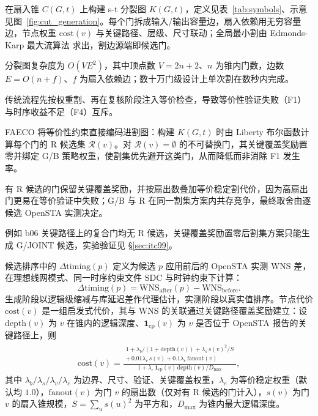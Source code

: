 \documentclass[twocolumn,10pt]{ctexart}
\begin{document}
在扇入锥 $C(G, t)$ 上构建 s-t 分裂图 $K(G, t)$，定义见表~\ref{tab:symbols}、示意见图~\ref{fig:cut_generation}。每个门拆成输入/输出容量边，扇入依赖用无穷容量边，节点权重 $\mathrm{cost}(v)$ 与关键路径、层级、尺寸联动；全局最小割由 Edmonds-Karp 最大流算法\cite{edmondskarp} 求出，割边源端即候选门。

分裂图复杂度为 $O(VE^2)$，其中顶点数 $V=2n+2$、$n$ 为锥内门数，边数 $E=O(n+f)$、$f$ 为扇入依赖边；数十万门级设计上单次割在数秒内完成。

传统流程先按权重割、再在复核阶段注入等价检查，导致等价性验证失败（F1）与时序收益不足（F4）互斥。

FAECO 将等价性约束直接编码进割图：构建 $K(G, t)$ 时由 Liberty 布尔函数计算每个门的 R 候选集 $\mathcal{R}(v)$。对 $\mathcal{R}(v)=\emptyset$ 的不可替换门，其关键覆盖奖励置零并绑定 G/B 策略权重，使割集优先避开这类门，从而降低而非消除 F1 发生率。

有 R 候选的门保留关键覆盖奖励，并按扇出数叠加等价稳定割代价，因为高扇出门更易在等价验证中失败；G/B 与 R 在同一割集方案内共存竞争，最终取舍由逐候选 OpenSTA 实测决定。

例如 b06 关键路径上的复合门均无 R 候选，关键覆盖奖励置零后割集方案只能生成 G/JOINT 候选，实验验证见 \S\ref{sec:itc99}。

候选排序中的 $\Delta\mathrm{timing}(p)$ 定义为候选 $p$ 应用前后的 OpenSTA 实测 WNS 差，在理想线网模式、同一时序约束文件 SDC 与时钟约束下计算：
\begin{equation}\label{eq:dtiming}
\Delta\mathrm{timing}(p) = \mathrm{WNS}_{\mathrm{after}}(p) - \mathrm{WNS}_{\mathrm{before}}.
\end{equation}
生成阶段以逻辑级缩减与库延迟差作代理估计，实测阶段以真实值排序。节点代价 $\mathrm{cost}(v)$ 是一组启发式代价，其与 WNS 的关联通过关键路径覆盖奖励建立：设 $\mathrm{depth}(v)$ 为 $v$ 在锥内的逻辑深度、$\mathbf{1}_{\mathrm{cp}}(v)$ 为 $v$ 是否位于 OpenSTA 报告的关键路径上，则
{\small
\begin{equation}
\label{eq:cost}
\begin{split}
\mathrm{cost}(v) = \frac{\substack{1 + \lambda_b/(1+\mathrm{depth}(v)) + \lambda_s\,s(v)^2/S \\ +\, 0.01\lambda_v\,s(v) + 0.1\lambda_e\,\mathrm{fanout}(v)}}{1 + \lambda_c\,\mathbf{1}_{\mathrm{cp}}(v)\,\mathrm{depth}(v)/D_{\max}},
\end{split}
\end{equation}
}
其中 $\lambda_b/\lambda_s/\lambda_v/\lambda_c$ 为边界、尺寸、验证、关键覆盖权重，$\lambda_e$ 为等价稳定权重（默认均 $1.0$），$\mathrm{fanout}(v)$ 为门 $v$ 的扇出数（仅对有 R 候选的门计入），$s(v)$ 为门 $v$ 的扇入锥规模，$S=\sum_u s(u)^2$ 为平方和，$D_{\max}$ 为锥内最大逻辑深度。
\end{document}
